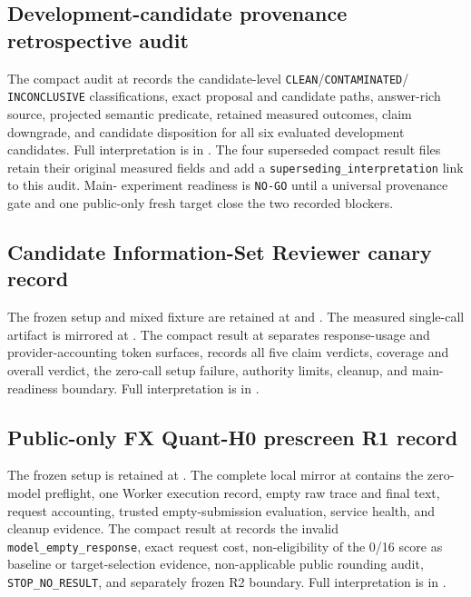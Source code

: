 \subsection{Development-candidate provenance retrospective audit}

The compact audit at
records the candidate-level \texttt{CLEAN}/\texttt{CONTAMINATED}/
\texttt{INCONCLUSIVE} classifications, exact proposal and candidate paths,
answer-rich source, projected semantic predicate, retained measured outcomes,
claim downgrade, and candidate disposition for all six evaluated development
candidates. Full interpretation is in
.
The four superseded compact result files retain their original measured fields
and add a \texttt{superseding\_interpretation} link to this audit. Main-
experiment readiness is \texttt{NO-GO} until a universal provenance gate and
one public-only fresh target close the two recorded blockers.

\subsection{Candidate Information-Set Reviewer canary record}

The frozen setup and mixed fixture are retained at
 and
. The
measured single-call artifact is mirrored at
.
The compact result at
separates response-usage and provider-accounting token surfaces, records all
five claim verdicts, coverage and overall verdict, the zero-call setup failure,
authority limits, cleanup, and main-readiness boundary. Full interpretation is
in
.

\subsection{Public-only FX Quant-H0 prescreen R1 record}

The frozen setup is retained at
. The complete local
mirror at
 contains
the zero-model preflight, one Worker execution record, empty raw trace and final
text, request accounting, trusted empty-submission evaluation, service health,
and cleanup evidence. The compact result at
 records the
invalid \texttt{model\_empty\_response}, exact request cost, non-eligibility of
the 0/16 score as baseline or target-selection evidence, non-applicable public
rounding audit, \texttt{STOP\_NO\_RESULT}, and separately frozen R2 boundary.
Full interpretation is in
.

